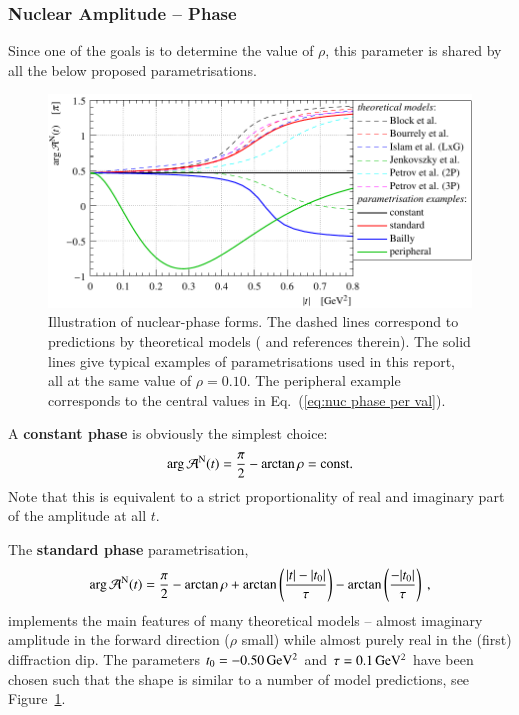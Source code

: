 \subsubsection{Nuclear Amplitude -- Phase}
\label{sec:cni nuclear phase}

Since one of the goals is to determine the value of $\rho$, this parameter is shared by all the below proposed parametrisations.

\begin{figure}
\begin{center}
\includegraphics{fig/hadronic_phase_illustration.pdf}
\caption{Illustration of nuclear-phase forms. The dashed lines correspond to predictions by theoretical models (\cite{elegent} and references therein). The solid lines give typical examples of parametrisations used in this report, all at the same value of $\rho = 0.10$. The peripheral example corresponds to the central values in Eq.~(\ref{eq:nuc phase per val}).
}
\label{fig:phase illustration}
\end{center}
\end{figure}


A {\bf constant phase} is obviously the simplest choice:
\begin{equation}
\label{eq:nuc phase con}
\arg {\cal A}^{\rm N}(t) = {\pi\over 2} - \arctan\rho = \hbox{const.}
\end{equation}
Note that this is equivalent to a strict proportionality of real and imaginary part of the amplitude at all $t$.

The {\bf standard phase} parametrisation,
\begin{equation}
\label{eqn:nuc phase std}
\arg {\cal A}^{\rm N}(t) = {\pi\over 2} - \arctan\rho + \arctan \left(\frac{|t|-|t_{0}|}{\tau}\right) -  \arctan \left(\frac{-|t_{0}|}{\tau}\right) \: ,
\end{equation}
implements the main features of many theoretical models -- almost imaginary amplitude in the forward direction ($\rho$ small) while almost purely real in the (first) diffraction dip. The parameters $t_0 = - 0.50\,{\rm GeV^2}$ and $\tau = 0.1\,{\rm GeV^2}$ have been chosen such that the shape is similar to a number of model predictions, see Figure~\ref{fig:phase illustration}.


